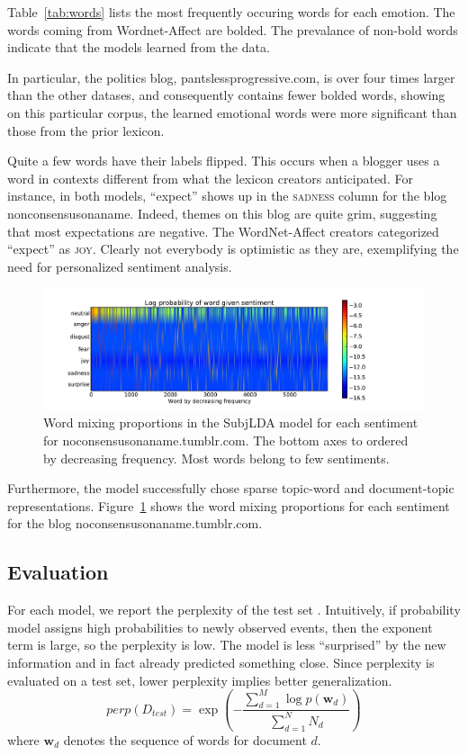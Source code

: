 \documentclass{article}
\begin{document}
Table~\ref{tab:words} lists the most frequently occuring words for
each emotion. The words coming from Wordnet-Affect are bolded. The
prevalance of non-bold words indicate that the models learned from
the data.

In particular, the politics blog, pantslessprogressive.com, is over
four times larger than the other datases, and consequently contains
fewer bolded words, showing on this particular corpus, the learned
emotional words were more significant than those from the prior
lexicon.

Quite a few words have their labels flipped. This occurs when a
blogger uses a word in contexts different from what the lexicon
creators anticipated. For instance, in both models, ``expect'' shows
up in the \textsc{sadness} column for the blog nonconsensusonaname.
Indeed, themes on this blog are quite grim, suggesting that most
expectations are negative. The WordNet-Affect creators categorized
``expect'' as \textsc{joy}. Clearly not everybody is optimistic as
they are, exemplifying the need for personalized sentiment analysis.

\begin{figure}[h]
\centering
\includegraphics[width=\textwidth, trim=15mm 0mm 40mm 0mm, clip]{sentiment_heatmap}
\caption{Word mixing proportions in the SubjLDA model for each
sentiment for noconsensusonaname.tumblr.com. The bottom axes to
ordered by decreasing frequency. Most words belong to few sentiments.
\label{fig:sparse}}
\end{figure}

Furthermore, the model successfully chose sparse topic-word
and document-topic representations. Figure~\ref{fig:sparse} shows
the word mixing proportions for each sentiment for the blog
noconsensusonaname.tumblr.com.

\subsection{Evaluation}
For each model, we report the perplexity of the test set \citep{blei03}.
Intuitively, if probability model assigns high probabilities to
newly observed events, then the exponent term is large, so the
perplexity is low. The model is less ``surprised'' by the new
information and in fact already predicted something close. Since
perplexity is evaluated on a test set, lower perplexity implies
better generalization.
\begin{equation}
perp(D_{test}) = \exp{\left(-\frac{\sum_{d=1}^M \log{p(\mathbf{w}_d)}}{\sum_{d=1}^N N_d}\right)}
\end{equation}
where $\mathbf{w}_d$ denotes the sequence of words for document
$d$.
\end{document}
